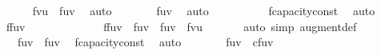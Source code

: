 \begin{isabellebody}
{\ \ \ \ \isamarkupfalse%
\ {\isacartoucheopen}f{\isacharprime}{\isacharparenleft}v{\isacharcomma}u{\isacharparenright}\ {\isasymle}\ f{\isacharparenleft}u{\isacharcomma}v{\isacharparenright}{\isacartoucheclose}\ \isamarkupfalse%
\ auto\isanewline
\ \ \isamarkupfalse%
\ \isamarkupfalse%
\ {\isachardoublequoteopen}{\isasymdots}\ {\isacharequal}\ f{\isacharprime}{\isacharparenleft}u{\isacharcomma}v{\isacharparenright}{\isachardoublequoteclose}\ \isamarkupfalse%
\ auto\isanewline
\ \ \isamarkupfalse%
\ \isamarkupfalse%
\ {\isachardoublequoteopen}{\isasymdots}\ {\isasymge}\ {}{\isachardoublequoteclose}\ \isamarkupfalse%
\ f{\isacharprime}{\isachardot}capacity{\isacharunderscore}const\ \isamarkupfalse%
\ auto\isanewline
\ \ \isamarkupfalse%
\ \isamarkupfalse%
\ {\isachardoublequoteopen}{\isacharparenleft}f{\isasymup}f{\isacharprime}{\isacharparenright}{\isacharparenleft}u{\isacharcomma}v{\isacharparenright}\ {\isasymge}\ {}{\isachardoublequoteclose}\ \isacommand{{\isachardot}}\isamarkupfalse%
\isanewline
\ \ \ \ \ \ \isanewline
\ \ \isamarkupfalse%
\ {\isachardoublequoteopen}{\isacharparenleft}f{\isasymup}f{\isacharprime}{\isacharparenright}{\isacharparenleft}u{\isacharcomma}v{\isacharparenright}\ {\isacharequal}\ f{\isacharparenleft}u{\isacharcomma}v{\isacharparenright}\ {\isacharplus}\ f{\isacharprime}{\isacharparenleft}u{\isacharcomma}v{\isacharparenright}\ {\isacharminus}\ f{\isacharprime}{\isacharparenleft}v{\isacharcomma}u{\isacharparenright}{\isachardoublequoteclose}\ \isanewline
\ \ \ \ \isamarkupfalse%
\ {\isacharparenleft}auto\ simp{\isacharcolon}\ augment{\isacharunderscore}def{\isacharparenright}\isanewline
\ \ \isamarkupfalse%
\ \isamarkupfalse%
\ {\isachardoublequoteopen}{\isasymdots}\ {\isasymle}\ f{\isacharparenleft}u{\isacharcomma}v{\isacharparenright}\ {\isacharplus}\ f{\isacharprime}{\isacharparenleft}u{\isacharcomma}v{\isacharparenright}{\isachardoublequoteclose}\ \isamarkupfalse%
\ f{\isacharprime}{\isachardot}capacity{\isacharunderscore}const\ \isamarkupfalse%
\ auto\isanewline
\ \ \isamarkupfalse%
\ \isamarkupfalse%
\ {\isachardoublequoteopen}{\isasymdots}\ {\isasymle}\ f{\isacharparenleft}u{\isacharcomma}v{\isacharparenright}\ {\isacharplus}\ cf{\isacharparenleft}u{\isacharcomma}v{\isacharparenright}{\isachardoublequoteclose}\ \isamarkupfalse%
}
\end{isabellebody}
